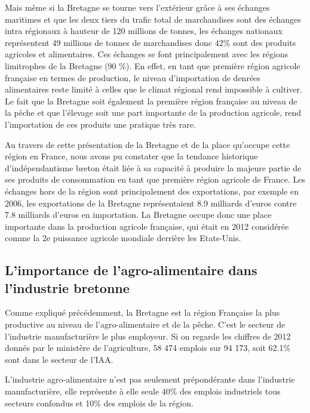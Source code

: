 \documentclass[a4paper,12pt]{report}
\begin{document}
			Mais même si la Bretagne se tourne vers l’extérieur grâce à ses échanges maritimes et que les deux tiers du trafic total de marchandises sont des échanges intra régionaux à hauteur de 120 millions de tonnes, les échanges nationaux représentent 49 millions de tonnes de marchandises donc 42\% sont des produits agricoles et alimentaires\cite{InfrastructureConnecterBretagneMondeCCI}. Ces échanges se font principalement avec les régions limitrophes de la Bretagne (90 \%). En effet, en tant que première région agricole française en termes de production, le niveau d’importation de denrées alimentaires reste limité à celles que le climat régional rend impossible à cultiver. Le fait que la Bretagne soit également la première région française au niveau de la pêche et que l’élevage soit une part importante de la production agricole, rend l’importation de ces produits une pratique très rare.
			
			Au travers de cette présentation de la Bretagne et de la place qu’occupe cette région en France, nous avons pu constater que la tendance historique d’indépendantisme breton était liée à sa capacité à produire la majeure partie de ses produits de consommation en tant que première région agricole de France. Les échanges hors de la région sont principalement des exportations, par exemple en 2006, les exportations de la Bretagne représentaient 8.9 milliards d’euros contre 7.8 milliards d’euros en importation. La Bretagne occupe donc une place importante dans la production agricole française, qui était en 2012 considérée comme la 2e puissance agricole mondiale derrière les Etats-Unis.
			
	
		\subsection{L'importance de l'agro-alimentaire dans l'industrie bretonne}
			Comme expliqué précédemment, la Bretagne est la région Française la plus productive au niveau de l’agro-alimentaire et de la pêche\cite{ChiffresCCI}. C’est le secteur de l’industrie manufacturière le plus employeur. Si on regarde les chiffres de 2012 donnés par le ministère de l’agriculture, 58 474 emplois sur 94 173, soit 62.1\% sont dans le secteur de l’IAA.
			
			L’industrie agro-alimentaire n’est pas seulement prépondérante dans l’industrie manufacturière, elle représente à elle seule 40\% des emplois industriels tous secteurs confondus et 10\% des emplois de la région\cite{OuEnEstIAABretonne}.
			
\end{document}
